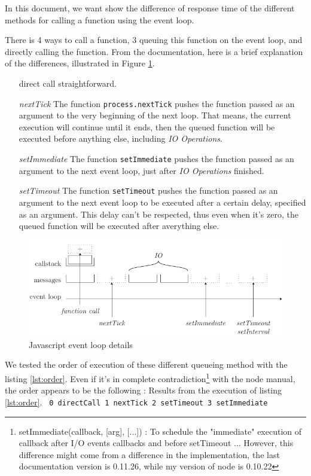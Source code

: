 \documentclass{article}
\begin{document}
In this document, we want show the difference of response time of the different methods for calling a function using the event loop.

There is 4 ways to call a function, 3 queuing this function on the event loop, and directly calling the function.
From the documentation, here is a brief explanation of the differences, illustrated in Figure \ref{fig:eventloop}.

\begin{itemize}
  \item[direct call] straightforward.
  \item[\textit{nextTick}] The function \texttt{process.nextTick} pushes the function passed as an argument to the very beginning of the next loop.
    That means, the current execution will continue until it ends, then the queued function will be executed before anything else, including \textit{IO Operations}.
  \item[\textit{setImmediate}] The function \texttt{setImmediate} pushes the function passed as an argument to the next event loop, just after \textit{IO Operations} finished.
  \item[\textit{setTimeout}] The function \texttt{setTimeout} pushes the function passed as an argument to the next event loop to be executed after a certain delay, specified as an argument.
    This delay can't be respected, thus even when it's zero, the queued function will be executed after averything else.
\end{itemize}

\begin{figure}[h!]
  \includegraphics[width=\linewidth]{eventloop.pdf}
  \caption{Javascript event loop details}
  \label{fig:eventloop}
\end{figure}

We tested the order of execution of these different queueing method with the listing \ref{lst:order}.
Even if it's in complete contradiction\footnote{setImmediate(callback, [arg], [...]) : To schedule the "immediate" execution of callback after I/O events callbacks and before setTimeout ... However, this difference might come from a difference in the implementation, the last documentation version is 0.11.26, while my version of node is 0.10.22} with the node manual, the order appears to be the following :
Results from the execution of listing \ref{lst:order}.
\texttt{
0 directCall
1 nextTick
2 setTimeout
3 setImmediate
}
\end{document}
